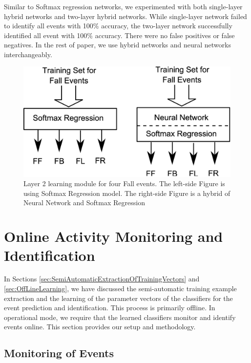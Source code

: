 \documentclass[]{IEEEtran}
\begin{document}
Similar to Softmax regression networks, we experimented  with both single-layer
hybrid networks and two-layer hybrid networks. While single-layer network
failed to identify all events with 100\% accuracy, the two-layer network
successfully identified all event with 100\% accuracy. There were no false
positives or false negatives. In the rest of paper, we use hybrid networks and
neural networks interchangeably.

\begin{figure}[t]
	\centering
		\includegraphics[width=0.7\columnwidth]{figures/SoftmaxLayer2Fall.eps}
	\caption{Layer 2 learning module for four Fall events. The left-side
Figure is using Softmax Regression model. The right-side Figure is a hybrid of
Neural Network and Softmax Regression } \label{fig:SoftmaxLayer2Fall}
\end{figure}


\section{Online Activity Monitoring and Identification}

In Sections \ref{sec:SemiAutomaticExtractionOfTrainingVectors} and
\ref{sec:OffLineLearning}, we have discussed the semi-automatic training
example extraction and the learning of the parameter vectors of the classifiers
for the event prediction and identification. This process is primarily offline.
In operational mode, we require that the learned classifiers monitor and
identify events online. This section provides our setup and methodology.  



\subsection{Monitoring of Events}
\end{document}
